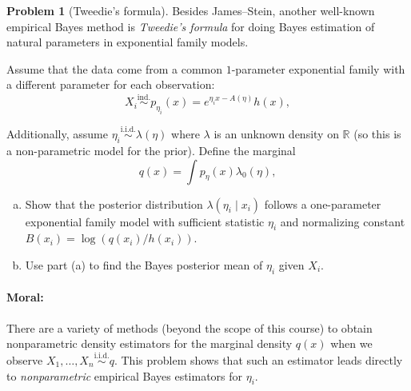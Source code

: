 \documentclass{article}
\newcommand{\RR}{\mathbb{R}}
\newcommand{\simiid}{\overset{\text{i.i.d.}}{\sim}}
\newcommand{\simind}{\overset{\text{ind.}}{\sim}}
\theoremstyle{definition}
\newtheorem{problem}{Problem}
\begin{document}
\begin{problem}[Tweedie's formula]

Besides James--Stein, another well-known empirical Bayes method is {\em Tweedie's formula} for doing Bayes estimation of natural parameters in exponential family models.

Assume that the data come from a common $1$-parameter exponential family with a different parameter for each observation:
\[
X_i \simind p_{\eta_i}(x) = e^{\eta_i x - A(\eta)}h(x),
\]

Additionally, assume $\eta_i \simiid \lambda(\eta)$ where $\lambda$ is an unknown density on $\RR$ (so this is a non-parametric model for the prior). Define the marginal
\[
q(x) = \int p_\eta(x) \lambda_0(\eta),
\]

\begin{enumerate}[(a)]

\item Show that the posterior distribution $\lambda(\eta_i \mid x_i)$ follows a one-parameter exponential family model with sufficient statistic $\eta_i$ and normalizing constant $B(x_i) = \log(q(x_i)/h(x_i))$.

\item Use part (a) to find the Bayes posterior mean of $\eta_i$ given $X_i$.

\end{enumerate}

\paragraph{Moral:} There are a variety of methods (beyond the scope of this course) to obtain nonparametric density estimators for the marginal density $q(x)$ when we observe $X_1,\ldots,X_n \simiid q$. This problem shows that such an estimator leads directly to {\em nonparametric} empirical Bayes estimators for $\eta_i$.
\end{problem}








\end{document}
